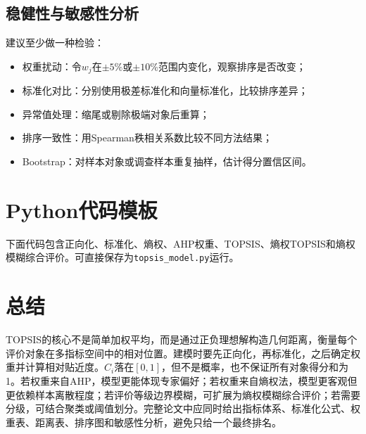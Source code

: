 \documentclass[UTF8,a4paper,12pt,fontset=none]{ctexart}
\begin{document}
\subsection{稳健性与敏感性分析}
建议至少做一种检验：
\begin{itemize}[leftmargin=2em]
  \item 权重扰动：令$w_j$在$\pm 5\%$或$\pm 10\%$范围内变化，观察排序是否改变；
  \item 标准化对比：分别使用极差标准化和向量标准化，比较排序差异；
  \item 异常值处理：缩尾或剔除极端对象后重算；
  \item 排序一致性：用Spearman秩相关系数比较不同方法结果；
  \item Bootstrap：对样本对象或调查样本重复抽样，估计得分置信区间。
\end{itemize}

\section{Python代码模板}
下面代码包含正向化、标准化、熵权、AHP权重、TOPSIS、熵权TOPSIS和熵权模糊综合评价。可直接保存为\texttt{topsis\_model.py}运行。



\section{总结}
TOPSIS的核心不是简单加权平均，而是通过正负理想解构造几何距离，衡量每个评价对象在多指标空间中的相对位置。建模时要先正向化，再标准化，之后确定权重并计算相对贴近度。$C_i$落在$[0,1]$，但不是概率，也不保证所有对象得分和为1。若权重来自AHP，模型更能体现专家偏好；若权重来自熵权法，模型更客观但更依赖样本离散程度；若评价等级边界模糊，可扩展为熵权模糊综合评价；若需要分级，可结合聚类或阈值划分。完整论文中应同时给出指标体系、标准化公式、权重表、距离表、排序图和敏感性分析，避免只给一个最终排名。
\end{document}
